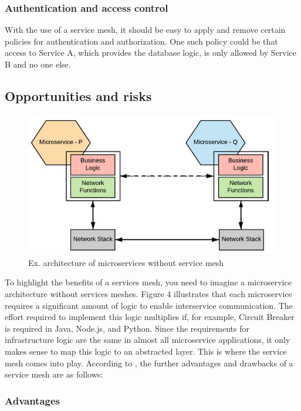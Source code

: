 \subsubsection{Authentication and access control}

With the use of a service mesh, it should be easy to apply and remove certain policies for authentication and authorization. One such policy could be that access to Service A, which provides the database logic, is only allowed by Service B and no one else.

\subsection{Opportunities and risks}

\begin{figure}
    \includegraphics[width=\columnwidth]{img/microservices_without_mesh.JPG}
    \caption{Ex. architecture of microservices without service mesh\cite[S. 265]{sm4}}
    \label{fig:microservice-without-mesh}
\end{figure}

To highlight the benefits of a services mesh, you need to imagine a microservice architecture without services meshes. Figure 4 illustrates that each microservice requires a significant amount of logic to enable interservice communication. The effort required to implement this logic multiplies if, for example, Circuit Breaker is required in Java, Node.js, and Python. Since the requirements for infrastructure logic are the same in almost all microservice applications, it only makes sense to map this logic to an abstracted layer. This is where the service mesh comes into play. According to \cite{sm4}, the further advantages and drawbacks of a service mesh are as follows:

\subsubsection{Advantages}

